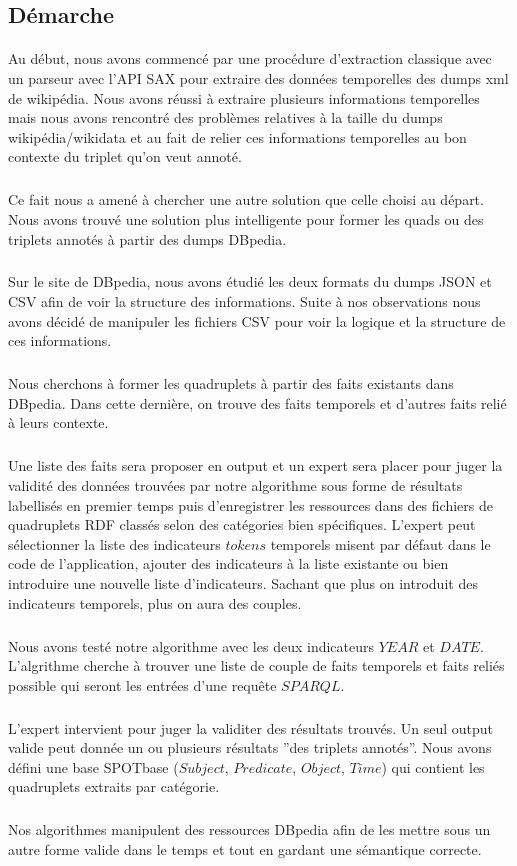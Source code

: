 \subsection*{Démarche}
\paragraph{}
Au début, nous avons commencé par une procédure d’extraction classique avec un parseur avec l'API SAX pour extraire des données temporelles des dumps xml de wikipédia. Nous avons réussi à extraire plusieurs informations temporelles mais nous avons rencontré des problèmes relatives à la taille du dumps wikipédia/wikidata et au fait de relier ces informations temporelles au bon contexte du triplet qu’on veut annoté.
\subparagraph{}
Ce fait nous a amené à chercher une autre solution que celle choisi au départ.
Nous avons trouvé une solution plus intelligente pour former les quads ou des triplets annotés à partir des dumps DBpedia.
\subparagraph{}
Sur le site de DBpedia, nous avons étudié les deux formats du dumps JSON et CSV afin de voir la structure des informations.
Suite à nos observations nous avons décidé de manipuler les fichiers CSV pour voir la logique et la structure de ces informations.
\subparagraph{}
Nous cherchons à former les quadruplets à partir des faits existants dans DBpedia.
Dans cette dernière, on trouve des faits temporels et d’autres faits relié à leurs contexte.
\subparagraph{}
Une liste des faits sera proposer en output et un expert sera placer pour juger la validité des données trouvées par notre algorithme sous forme de résultats labellisés en premier temps puis d'enregistrer les ressources dans des fichiers de quadruplets RDF classés selon des catégories bien spécifiques.
L’expert peut sélectionner la liste des indicateurs $tokens$ temporels misent par défaut dans le code de l’application, ajouter des indicateurs à la liste existante ou bien introduire une nouvelle liste d’indicateurs.
Sachant que plus on introduit des indicateurs temporels, plus on aura des couples.
\subparagraph{}
Nous avons testé notre algorithme avec les deux indicateurs $YEAR$ et $DATE$.
L'algrithme cherche à trouver une liste de couple de faits temporels et faits reliés possible qui seront les entrées d'une requête $SPARQL$.
\subparagraph{}
L'expert intervient pour juger la validiter des résultats trouvés.
Un seul output valide peut donnée un ou plusieurs résultats ''des triplets annotés''.
Nous avons défini une base SPOTbase ($Subject$, $Predicate$, $Object$, $Time$) qui contient les quadruplets extraits par catégorie.
\subparagraph{}
Nos algorithmes manipulent des ressources DBpedia afin de les mettre sous un autre forme valide dans le temps et tout en gardant une sémantique correcte. 
